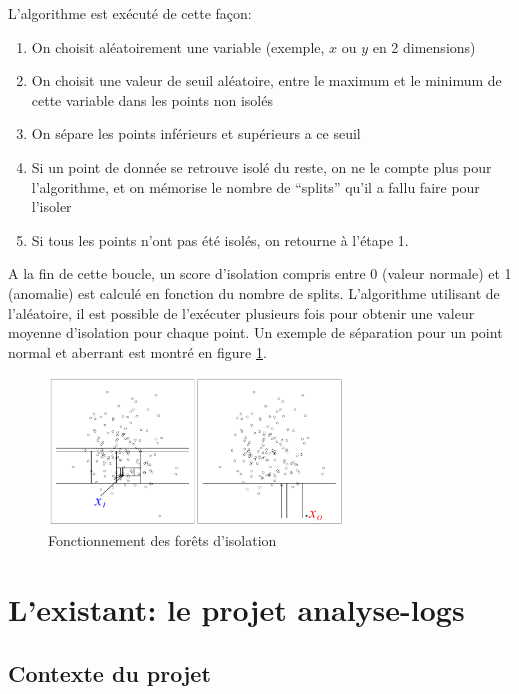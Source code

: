 \documentclass[openany, 11pt]{memoir}
\begin{document}
L'algorithme est exécuté de cette façon:

\begin{enumerate}
	\item On choisit aléatoirement une variable (exemple, $x$ ou $y$ en 2 dimensions)
	\item On choisit une valeur de seuil aléatoire, entre le maximum et le minimum de cette variable dans les points non isolés
	\item On sépare les points inférieurs et supérieurs a ce seuil
	\item Si un point de donnée se retrouve isolé du reste, on ne le compte plus pour l'algorithme, et on mémorise le nombre de ``splits'' qu'il a fallu faire pour l'isoler
	\item Si tous les points n'ont pas été isolés, on retourne à l'étape 1.
\end{enumerate}

A la fin de cette boucle, un score d'isolation compris entre 0 (valeur normale) et 1 (anomalie) est calculé en fonction du nombre de splits. L'algorithme utilisant de l'aléatoire, il est possible de l'exécuter plusieurs fois pour obtenir une valeur moyenne d'isolation pour chaque point. Un exemple de séparation pour un point normal et aberrant est montré en figure \ref{isoforest}.

\begin{figure}[ht]
	\centering
	\includegraphics[width=0.7\textwidth]{images/isoforest.png}
	\caption{Fonctionnement des forêts d'isolation}
	\label{isoforest}
\end{figure}

\newpage
\chapter{L'existant: le projet analyse-logs}

\section{Contexte du projet}
\end{document}
